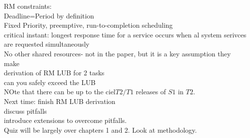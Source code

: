 \documentclass{article}
\begin{document}
RM constraints:\\
Deadline=Period by definition\\
Fixed Priority, preemptive, run-to-completion scheduling\\

critical instant: longest response time for a service occurs when al system serivces are requested simultaneously\\
No other shared resources- not in the paper, but it is a key assumption they make\\

derivation of RM LUB for 2 tasks\\
can you safely exceed the LUB\\

NOte that there can be up to the ciel$T2/T1$ releases of $S1$ in $T2$.\\


Next time: finish RM LUB derivation\\
discuss pitfalls\\
introduce extensions to overcome pitfalls.\\


Quiz will be largely over chapters 1 and 2. Look at methodology.
\end{document}
